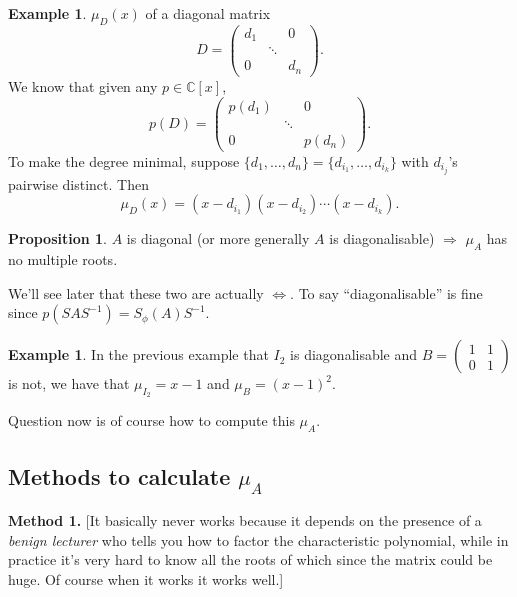 \documentclass[a4paper]{article}
\theoremstyle{definition}
\newtheorem{prop}[defn]{Proposition}
\newtheorem{example}[defn]{Example}
\begin{document}
\begin{example}
	$\mu_{D}(x)$ of a diagonal matrix
\[
D=\begin{pmatrix}
		d_1 & & 0 \\ & \ddots & \\ 0 & & d_n
	\end{pmatrix} .
\]
We know that given any $p\in \mathbb C [x]$,
\[
p(D) = \begin{pmatrix}
		p(d_1) & & 0 \\ & \ddots & \\ 0 & & p(d_n)
	\end{pmatrix} .
\]
To make the degree minimal, suppose $\{d_1,\ldots,d_n\}=\{d_{i_1},\ldots,d_{i_k}\}$ with $d_{i_j}$'s pairwise distinct. Then
\[
\mu_{D}(x)=(x-d_{i_1})(x-d_{i_2})\cdots (x-d_{i_k}) .
\]
\end{example}

\begin{prop}
	$A$ is diagonal (or more generally $A$ is diagonalisable) $\Rightarrow$ $\mu_{A}$ has no multiple roots.
\end{prop}

We'll see later that these two are actually $\Leftrightarrow$. To say ``diagonalisable'' is fine since $p(SAS^{-1})=S_{\phi}(A)S^{-1} .$

\begin{example}
In the previous example that $I_2$ is diagonalisable and $B=\begin{pmatrix}
	1&1\\0&1
\end{pmatrix}$ is not, we have that $\mu_{I_2}=x-1$ and $\mu_{B}=(x-1)^2$.
\end{example}	

Question now is of course how to compute this $\mu_{A}$.

\subsection{Methods to calculate $\mu_{A}$}

\textbf{Method 1.} [It basically never works because it depends on the presence of a \textit{benign lecturer} who tells you how to factor the characteristic polynomial, while in practice it's very hard to know all the roots of which since the matrix could be huge. Of course when it works it works well.]
\end{document}
